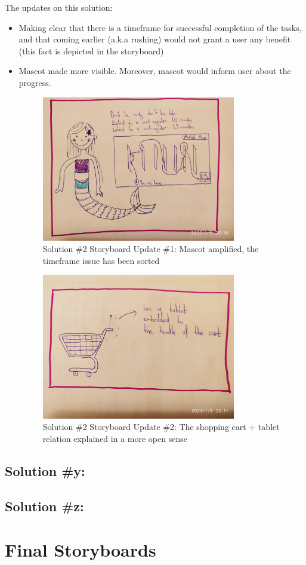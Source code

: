\documentclass[a4paper,10pt,oneside]{scrreprt}
\begin{document}
The updates on this solution:
\begin{itemize}
	\item Making clear that there is a timeframe for successful completion of the tasks, and that coming earlier (a.k.a rushing) would not grant a user any benefit (this fact is depicted in the storyboard)
	\item Mascot made more visible. Moreover, mascot would inform user about the progress.
	
\begin{figure}[H]
	\centering
	\includegraphics[width=0.8\textwidth, clip, trim={10em 8em 25em 0em}]{images/s2_p1.jpg}
	\caption{Solution \#2 Storyboard Update \#1: \newline Mascot amplified, the timeframe issue has been sorted}
\end{figure}

\begin{figure}[H]
	\centering
	\includegraphics[width=0.8\textwidth, clip, trim={10em 50em 5em 20em}]{images/s2_p2.jpg}
	\caption{Solution \#2 Storyboard Update \#2: \newline The shopping cart + tablet relation explained in a more open sense}
\end{figure}
\end{itemize}

\section{Solution \#y:}

\section{Solution \#z:}

\chapter{Final Storyboards}
				
\end{document}
